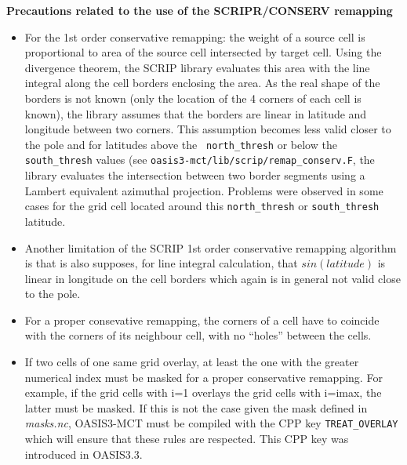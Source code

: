 \begin{itemize}
\begin{itemize}
\end{itemize}

{\bf Precautions related to the use of the SCRIPR/CONSERV remapping}

\begin{itemize}

\item For the 1st order conservative remapping: the weight of a source
  cell is proportional to area of the source cell intersected by
  target cell.  Using the divergence theorem, the SCRIP library
  evaluates this area with the line integral along the cell borders
  enclosing the area. As the real shape of the borders is not known
  (only the location of the 4 corners of each cell is known), the
  library assumes that the borders are linear in latitude and
  longitude between two corners.  This assumption becomes
  less valid closer to the pole and for latitudes above the {\tt
    north\_thresh} or below the {\tt south\_thresh} values (see 
{\tt oasis3-mct/lib/scrip/remap\_conserv.F}, the library evaluates
  the intersection between two border segments using a Lambert
  equivalent azimuthal projection. Problems were observed in some
  cases for the grid cell located around this {\tt north\_thresh} or
  {\tt south\_thresh} latitude.

\item Another limitation of the SCRIP 1st order conservative remapping 
  algorithm is that is also supposes, for
  line integral calculation, that $sin(latitude)$ is linear in
  longitude on the cell borders which again is in general not valid
  close to the pole. 

 \item For a proper consevative remapping, the corners of a cell have
   to coincide with the corners of its neighbour cell, with no
   ``holes'' between the cells.
  
\item  If two cells of one same grid overlay, at least the one with the
    greater numerical index must be masked for a proper conservative remapping.  
    For example, if the grid cells with i=1 overlays the grid cells
    with i=imax, the latter must be masked.  If this
    is not the case given the mask defined in {\it masks.nc}, OASIS3-MCT must 
    be compiled with the CPP key {\tt TREAT\_OVERLAY} which will ensure 
    that these rules are respected. This CPP key was introduced in 
    OASIS3.3.
      

\end{itemize}
\end{itemize}
